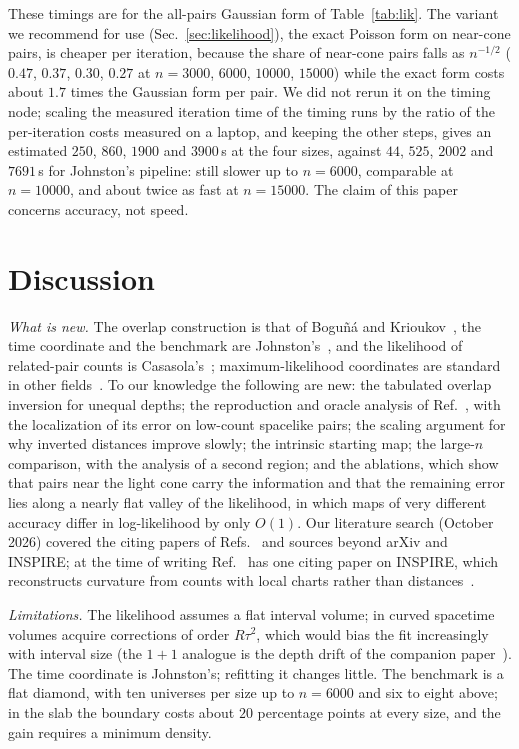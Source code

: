 \documentclass[prd,twocolumn,superscriptaddress,nofootinbib,amsmath,amssymb,floatfix]{revtex4-2}
\begin{document}
These timings are for the all-pairs Gaussian form of Table~\ref{tab:lik}. The variant we recommend for use (Sec.~\ref{sec:likelihood}), the exact Poisson form on near-cone pairs, is cheaper per iteration, because the share of near-cone pairs falls as $n^{-1/2}$ ($0.47$, $0.37$, $0.30$, $0.27$ at $n=3000$, $6000$, $10000$, $15000$) while the exact form costs about $1.7$ times the Gaussian form per pair. We did not rerun it on the timing node; scaling the measured iteration time of the timing runs by the ratio of the per-iteration costs measured on a laptop, and keeping the other steps, gives an estimated $250$, $860$, $1900$ and $3900$\,s at the four sizes, against $44$, $525$, $2002$ and $7691$\,s for Johnston's pipeline: still slower up to $n=6000$, comparable at $n=10000$, and about twice as fast at $n=15000$. The claim of this paper concerns accuracy, not speed.

\section{Discussion}\label{sec:disc}
\emph{What is new.} The overlap construction is that of Bogu\~n\'a and Krioukov~\cite{BK24}, the time coordinate and the benchmark are Johnston's~\cite{Johnston25}, and the likelihood of related-pair counts is Casasola's~\cite{Casasola26}; maximum-likelihood coordinates are standard in other fields~\cite{Ramsay77,Hoff02,BPK10,Mercator19,Sim21}. To our knowledge the following are new: the tabulated overlap inversion for unequal depths; the reproduction and oracle analysis of Ref.~\cite{Johnston25}, with the localization of its error on low-count spacelike pairs; the scaling argument for why inverted distances improve slowly; the intrinsic starting map; the large-$n$ comparison, with the analysis of a second region; and the ablations, which show that pairs near the light cone carry the information and that the remaining error lies along a nearly flat valley of the likelihood, in which maps of very different accuracy differ in log-likelihood by only $O(1)$. Our literature search (October 2026) covered the citing papers of Refs.~\cite{BK24,Johnston25,CloughEvans16,Casasola26} and sources beyond arXiv and INSPIRE; at the time of writing Ref.~\cite{Johnston25} has one citing paper on INSPIRE, which reconstructs curvature from counts with local charts rather than distances~\cite{Madsen26}.

\emph{Limitations.} The likelihood assumes a flat interval volume; in curved spacetime volumes acquire corrections of order $R\tau^2$, which would bias the fit increasingly with interval size (the $1+1$ analogue is the depth drift of the companion paper~\cite{Toolkit}). The time coordinate is Johnston's; refitting it changes little. The benchmark is a flat diamond, with ten universes per size up to $n=6000$ and six to eight above; in the slab the boundary costs about $20$ percentage points at every size, and the gain requires a minimum density.
\end{document}
